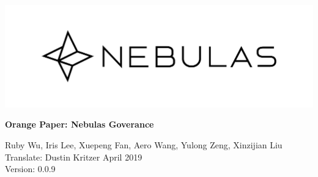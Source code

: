 \documentclass[12pt]{article}
\begin{document}
\pagestyle{empty}

\pagecolor{\pcolor}

\begin{titlepage}
  \begin{center}
    \vspace*{5.5cm}
    \includegraphics[scale=0.1]{../common/Nebulas.png}
    \vspace{0.5cm}


    \textbf{\huge{Orange Paper: Nebulas Goverance}}

    \vspace{0.5cm}
    Ruby Wu, Iris Lee, Xuepeng Fan, Aero Wang, Yulong Zeng, Xinzijian Liu \\
    Translate: Dustin Kritzer
    \vfill
    April 2019\\
    Version: 0.0.9
    \textbf{}
  \end{center}

\end{titlepage}
\setcounter{page}{0}
\tableofcontents
\newpage
\setcounter{page}{1}
\pagestyle{fancy}
\vspace*{0.01cm}





\newpage


\newpage
\begin{appendices}


\end{appendices}
\end{document}
